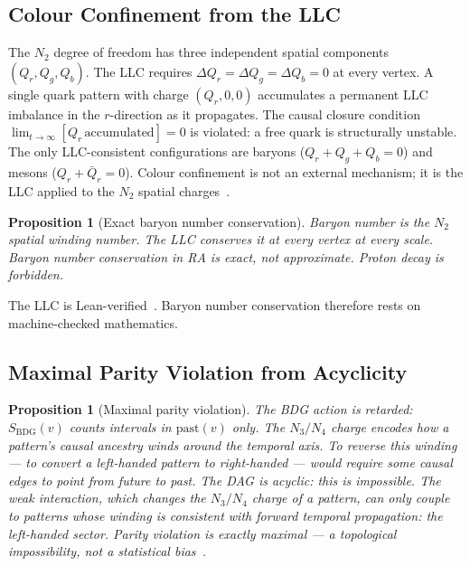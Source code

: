 \documentclass[11pt,a4paper]{article}
\newtheorem{proposition}[theorem]{Proposition}
\newcommand{\SBDG}{S_{\mathrm{BDG}}}
\begin{document}
\subsection{Colour Confinement from the LLC}

The $N_2$ degree of freedom has three independent spatial components
$(Q_r, Q_g, Q_b)$. The LLC requires $\Delta Q_r = \Delta Q_g =
\Delta Q_b = 0$ at every vertex. A single quark pattern with charge
$(Q_r, 0, 0)$ accumulates a permanent LLC imbalance in the $r$-direction
as it propagates. The causal closure condition
$\lim_{t\to\infty}[Q_r\,\mathrm{accumulated}] = 0$ is violated: a free
quark is structurally unstable. The only LLC-consistent configurations
are baryons ($Q_r + Q_g + Q_b = 0$) and mesons ($Q_r + \bar{Q}_r = 0$).
Colour confinement is not an external mechanism; it is the LLC applied
to the $N_2$ spatial charges~\citep{Sandeman2026RASM}.

\begin{proposition}[Exact baryon number conservation]
\label{prop:baryon}
Baryon number is the $N_2$ spatial winding number. The LLC conserves it
at every vertex at every scale. Baryon number conservation in RA is
exact, not approximate. Proton decay is forbidden.
\end{proposition}

The LLC is Lean-verified~\citep{Sandeman2026RAGC}. Baryon number
conservation therefore rests on machine-checked mathematics.

\subsection{Maximal Parity Violation from Acyclicity}

\begin{proposition}[Maximal parity violation]
\label{prop:parity}
The BDG action is retarded: $\SBDG(v)$ counts intervals in
$\mathrm{past}(v)$ only. The $N_3/N_4$ charge encodes how a pattern's
causal ancestry winds around the temporal axis. To reverse this winding
--- to convert a left-handed pattern to right-handed --- would require
some causal edges to point from future to past. The DAG is acyclic:
this is impossible. The weak interaction, which changes the $N_3/N_4$
charge of a pattern, can only couple to patterns whose winding is
consistent with forward temporal propagation: the left-handed sector.
Parity violation is exactly maximal --- a topological impossibility,
not a statistical bias~\citep{Sandeman2026RASM}.
\end{proposition}
\end{document}
